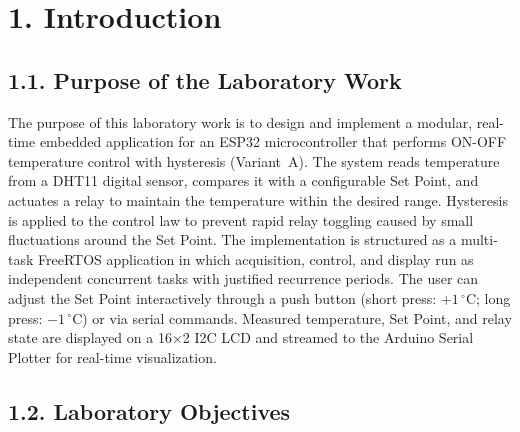 \documentclass[12pt]{article}
\begin{document}
\setcounter{page}{1}
\pagestyle{fancy}
\fancyhf{}
\rhead{\thepage}

\section*{1. Introduction}

\subsection*{1.1. Purpose of the Laboratory Work}

The purpose of this laboratory work is to design and implement a modular, real-time
embedded application for an ESP32 microcontroller that performs ON-OFF temperature
control with hysteresis (Variant~A). The system reads temperature from a DHT11
digital sensor, compares it with a configurable Set Point, and actuates a relay to
maintain the temperature within the desired range. Hysteresis is applied to the
control law to prevent rapid relay toggling caused by small fluctuations around the
Set Point. The implementation is structured as a multi-task FreeRTOS application in
which acquisition, control, and display run as independent concurrent tasks with
justified recurrence periods. The user can adjust the Set Point interactively through
a push button (short press: $+1\,^{\circ}$C; long press: $-1\,^{\circ}$C) or via
serial commands. Measured temperature, Set Point, and relay state are displayed on a
16$\times$2 I2C LCD and streamed to the Arduino Serial Plotter for real-time
visualization.

\subsection*{1.2. Laboratory Objectives}
\end{document}
